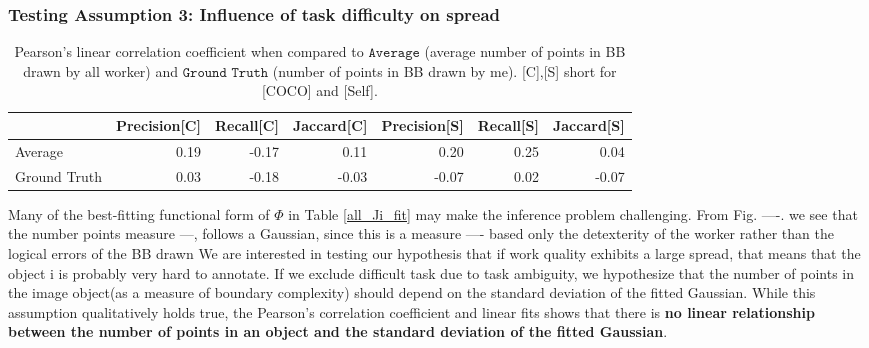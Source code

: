 \documentclass[12pt]{article}
\begin{document}
\subsubsection{Testing Assumption 3: Influence of task difficulty on spread}
\begin{table}[ht]
\centering
\begin{tabular}{lrrrrrr}
\hline
                              &   Precision[C] &   Recall[C] &   Jaccard[C] &   Precision[S] &   Recall[S] &   Jaccard[S] \\
\hline
 Average             &   0.19 &  -0.17 &   0.11 &   0.20 &   0.25 &   0.04 \\
Ground Truth &   0.03 &  -0.18 &  -0.03 &  -0.07 &   0.02 &  -0.07 \\
\hline
\end{tabular}
\caption{Pearson's linear correlation coefficient when compared to $\texttt{Average}$ (average number of points in BB drawn by all worker) and  $\texttt{Ground Truth}$ (number of points in BB drawn by me). [C],[S] short for [COCO] and [Self].}
\end{table}
\par Many of the best-fitting functional form of $\Phi$ in Table \ref{all_Ji_fit} may make the inference problem challenging.  From Fig.  ----. we see that the number points  measure ---, follows a Gaussian, since this is a measure ---- based only the detexterity of the worker rather than the logical errors of the BB drawn
We are interested in testing our hypothesis that if work quality exhibits a large spread, that means that the object i is probably very hard to annotate. If we exclude difficult task due to task ambiguity, we hypothesize that the number of points in the image object(as a measure of boundary complexity) should depend on the standard deviation of the fitted Gaussian. While this assumption qualitatively holds true, the Pearson's correlation coefficient and linear fits shows that there is \textbf{no linear relationship between the number of points in an object and the standard deviation of the fitted Gaussian}.



\newpage
\appendix
\end{document}
